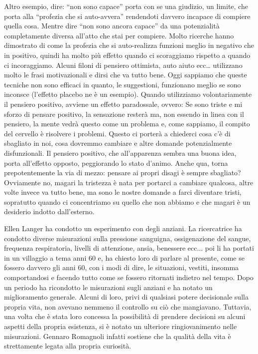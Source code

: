 \documentclass[12pt]{book} %
\begin{document}
Altro esempio, dire: “non sono capace” porta con se una giudizio, un limite, che porta alla “profezia che si
auto-avvera” rendendoti davvero incapace di compiere quella cosa. Mentre dire “non sono ancora capace” da una
potenzialità completamente diversa all'atto che stai per compiere. Molto ricerche hanno dimostrato di come la profezia
che si auto-realizza funzioni meglio in negativo che in positivo, quindi ha molto più effetto quando ci scoraggiamo
rispetto a quando ci incoraggiamo. Alcuni filoni di pensiero ottimista, auto aiuto ecc… utilizzano molto le frasi
motivazionali e dirsi che va tutto bene. Oggi sappiamo che queste tecniche non sono efficaci in quanto, le suggestioni,
funzionano meglio se sono inconsce (l'effetto placebo ne è un esempio). Quando utilizziamo
volontariamente il pensiero positivo, avviene un effetto paradossale, ovvero: Se sono triste e mi sforzo di pensare
positivo, la sensazione resterà ma, non essendo in linea con il pensiero, la mente vedrà questo come un problema e,
come sappiamo, il compito del cervello è risolvere i problemi. Questo ci porterà a chiederci cosa
c'è di sbagliato in noi, cosa dovremmo cambiare e altre domande potenzialmente disfunzionali. Il
pensiero positivo, che all'apparenza sembra una buona idea, porta all'effetto
opposto, peggiorando lo stato d'animo. Anche qua, torna prepotentemente la via di mezzo: pensare
ai propri disagi è sempre sbagliato? Ovviamente no, magari la tristezza è nata per portarci a cambiare qualcosa, altre
volte invece va tutto bene, ma sono le nostre domande a farci diventare tristi, sopratutto quando ci concentriamo su
quello che non abbiamo e che magari è un desiderio indotto dall'esterno.

Ellen Langer ha condotto un esperimento con degli anziani. La ricercatrice ha condotto diverse misurazioni sulla
pressione sanguigna, ossigenazione del sangue, frequenza respiratoria, livelli di attenzione, ansia, benessere ecc...
poi li ha portati in un villaggio a tema anni 60 e, ha chiesto loro di parlare al presente, come se fossero davvero gli
anni 60, con i modi di dire, le situazioni, vestiti, insomma comportandosi e facendo tutto come se fossero ritornati
indietro nel tempo. Dopo un periodo ha ricondotto le misurazioni sugli anziani e ha notato un miglioramento generale.
Alcuni di loro, privi di qualsiasi potere decisionale sulla propria vita, non avevano nemmeno il controllo su ciò che
mangiavano. Tuttavia, una volta che è stata loro concessa la possibilità di prendere decisioni su alcuni aspetti della
propria esistenza, si è notato un ulteriore ringiovanimento nelle misurazioni. Gennaro Romagnoli infatti sostiene che
la qualità della vita è strettamente legata alla propria
curiosità.
\end{document}
